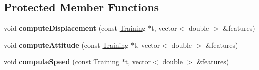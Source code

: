 \subsection*{\-Protected \-Member \-Functions}
\begin{DoxyCompactItemize}
\item 
\hypertarget{class_m_l_data_ae765a15668c6e9712f8a80e0e7e51318}{void {\bfseries compute\-Displacement} (const \hyperlink{class_training}{\-Training} $\ast$t, vector$<$ double $>$ \&features)}\label{class_m_l_data_ae765a15668c6e9712f8a80e0e7e51318}

\item 
\hypertarget{class_m_l_data_a1b7e769886def696342570e1cc8dfed3}{void {\bfseries compute\-Attitude} (const \hyperlink{class_training}{\-Training} $\ast$t, vector$<$ double $>$ \&features)}\label{class_m_l_data_a1b7e769886def696342570e1cc8dfed3}

\item 
\hypertarget{class_m_l_data_a41b970ab7a434b3b8f17abdae6008993}{void {\bfseries compute\-Speed} (const \hyperlink{class_training}{\-Training} $\ast$t, vector$<$ double $>$ \&features)}\label{class_m_l_data_a41b970ab7a434b3b8f17abdae6008993}

\end{DoxyCompactItemize}
